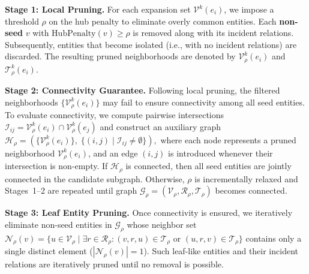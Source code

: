 \textbf{Stage 1: Local Pruning.}
For each expansion set $\mathcal{V}^k(e_i)$, we impose a threshold $\rho$ on the hub penalty to eliminate overly common entities.    
Each \textbf{non-seed}  $v$ with $\mathrm{HubPenalty}(v) \geq \rho$ is removed along with its incident relations.  
Subsequently, entities that become isolated (i.e., with no incident relations) are discarded.  
The resulting pruned neighborhoods are denoted by $\mathcal{V}_\rho^k(e_i)$ and $\mathcal{T}_\rho^k(e_i)$.

\textbf{Stage 2: Connectivity Guarantee.}
Following local pruning, the filtered neighborhoods $\{\mathcal{V}_\rho^k(e_i)\}$ may fail to ensure connectivity among all seed entities.  
To evaluate connectivity, we compute pairwise intersections 
\small
$\mathcal{I}_{ij} = \mathcal{V}_\rho^k(e_i) \cap \mathcal{V}_\rho^k(e_j)$ 
\normalsize
and construct an auxiliary graph
\small
$
\mathcal{H}_\rho = ( \{ \mathcal{V}_\rho^k(e_i) \}, \; \{ (i,j) \mid \mathcal{I}_{ij}\neq \emptyset \} ),
$
\normalsize
where each node represents a pruned neighborhood $\mathcal{V}_\rho^k(e_i)$,  
and an edge $(i,j)$ is introduced whenever their intersection is non-empty.  
If $\mathcal{H}_\rho$ is connected, then all seed entities are jointly connected in the candidate subgraph.  
Otherwise, $\rho$ is incrementally relaxed and Stages~1--2 are repeated until graph $\mathcal G_\rho = (\mathcal{V}_{\rho}, \mathcal{R}_{\rho}, \mathcal{T}_{\rho})$ becomes connected.



\textbf{Stage 3: Leaf Entity Pruning.}
Once connectivity is ensured, we iteratively eliminate non-seed entities in  $\mathcal G_\rho$ whose neighbor set \small $\mathcal{N}_{\rho}(v) = \{ u \in \mathcal{V}_{\rho} \mid \exists r \in \mathcal{R}_{\rho}: (v,r,u) \in \mathcal{T}_{\rho}$ or $(u,r,v) \in \mathcal{T}_{\rho} \}$ \normalsize contains only a single distinct element (\small $|\mathcal{N}_{\rho}(v)| = 1$\normalsize). Such leaf-like entities and their incident relations are iteratively pruned until no removal is possible. 

